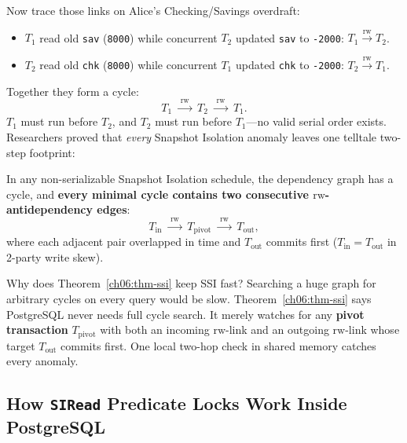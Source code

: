 Now trace those links on Alice's Checking/Savings overdraft:
\begin{itemize}
  \item $T_1$ read old \texttt{sav} (\texttt{8000}) while concurrent $T_2$ updated \texttt{sav} to \texttt{-2000}: $T_1 \xrightarrow{\mathrm{rw}} T_2$.
  \item $T_2$ read old \texttt{chk} (\texttt{8000}) while concurrent $T_1$ updated \texttt{chk} to \texttt{-2000}: $T_2 \xrightarrow{\mathrm{rw}} T_1$.
\end{itemize}
Together they form a cycle:
\[
  T_1 \;\xrightarrow{\;\mathrm{rw}\;}\; T_2 \;\xrightarrow{\;\mathrm{rw}\;}\; T_1.
\]
$T_1$ must run before $T_2$, and $T_2$ must run before $T_1$---no valid serial order exists. Researchers proved that \emph{every} Snapshot Isolation anomaly leaves one telltale two-step footprint:

\begin{theorem}
\label{ch06:thm-ssi}
In any non-serializable Snapshot Isolation schedule, the dependency graph has a cycle, and \textbf{every minimal cycle contains two consecutive $\mathrm{rw}$-antidependency edges}:
\[
  T_{\mathrm{in}} \;\xrightarrow{\;\mathrm{rw}\;}\; T_{\mathrm{pivot}} \;\xrightarrow{\;\mathrm{rw}\;}\; T_{\mathrm{out}},
\]
where each adjacent pair overlapped in time and $T_{\mathrm{out}}$ commits first ($T_{\mathrm{in}} = T_{\mathrm{out}}$ in 2-party write skew).
\end{theorem}

\begin{intuitionbox}
Why does Theorem~\ref{ch06:thm-ssi} keep SSI fast? Searching a huge graph for arbitrary cycles on every query would be slow. Theorem~\ref{ch06:thm-ssi} says PostgreSQL never needs full cycle search. It merely watches for any \textbf{pivot transaction} $T_{\mathrm{pivot}}$ with both an incoming $\mathrm{rw}$-link and an outgoing $\mathrm{rw}$-link whose target $T_{\mathrm{out}}$ commits first. One local two-hop check in shared memory catches every anomaly.
\end{intuitionbox}

\subsection{How \texttt{SIRead} Predicate Locks Work Inside PostgreSQL}

